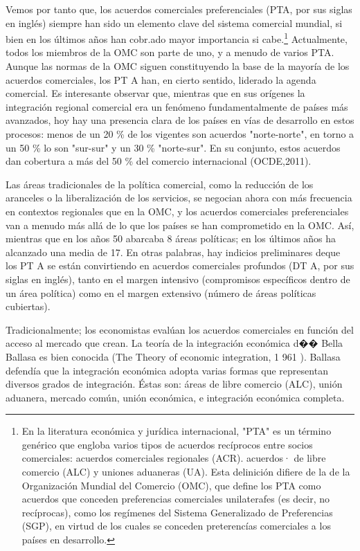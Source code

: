 \documentclass[10pt,a4paper]{article}
\begin{document}
Vemos por tanto que, los acuerdos comerciales preferenciales (PTA, por sus siglas en inglés) siempre han sido un elemento clave del sistema comercial mundial, si bien en los últimos años han cobr.ado mayor importancia si cabe.\footnote{%
    En la literatura económica y jurídica internacional, "PTA" es un término genérico que engloba varios tipos de acuerdos recíprocos entre socios comerciales: acuerdos comerciales regionales (ACR). acuerdos· de libre comercio (ALC) y uniones aduaneras (UA). Esta delinición difiere de la de la Organización Mundial del Comercio (OMC), que define los PTA como acuerdos que conceden preferencias comerciales unilaterafes (es decir, no recíprocas), como los regímenes del Sistema Generalizado de Preferencias (SGP), en virtud de los cuales se conceden preterencías comerciales a los países en desarrollo.
} Actualmente, todos los miembros de la OMC son parte de uno, y a menudo de varios PTA. Aunque las normas de la OMC siguen constituyendo la base de la mayoría de los acuerdos comerciales, los PT A han, en cierto sentido, liderado la agenda comercial. Es interesante observar que, mientras que en sus orígenes la integración regional comercial era un fenómeno fundamentalmente de países más avanzados, hoy hay una presencia clara de los países en vías de desarrollo en estos procesos: menos de un 20 \% de los vigentes son acuerdos "norte-norte", en torno a un 50 \% lo son "sur-sur" y un 30 \% "norte-sur". En su conjunto, estos acuerdos dan cobertura a más del 50 \% del comercio internacional (OCDE,2011).

Las áreas tradicionales de la política comercial, como la reducción de los aranceles o la liberalización de los servicios, se negocian ahora con más frecuencia en contextos regionales que en la OMC, y los acuerdos comerciales preferenciales van a menudo más allá de lo que los países se han comprometido en la OMC. Así, mientras que en los años 50 abarcaba 8 áreas políticas; en los últimos años ha alcanzado una media de 17. En otras palabras, hay indicios preliminares deque los PT A se están convirtiendo en acuerdos comerciales profundos (DT A, por sus siglas en inglés), tanto en el margen intensivo (compromisos específicos dentro de un área política) como en el margen extensivo (número de áreas políticas cubiertas).

Tradicionalmente; los economistas evalúan los acuerdos comerciales en función del acceso al mercado que crean. La teoría de la integración económica d�� Bella Ballasa es bien conocida (The Theory of economic integration, 1 961 ). Ballasa defendía que la integración económica adopta varias formas que representan diversos grados de integración. Éstas son: áreas de libre comercio (ALC), unión aduanera, mercado común, unión económica, e integración económica completa.
\end{document}
